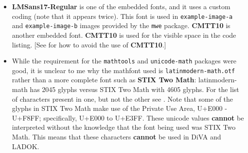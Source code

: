 \documentclass[12pt, twoside]{article}
\newcommand{\fname}[1]{\texttt{#1}}
\begin{document}
\begin{itemize}[label=\color{red}]
\item \textbf{LMSans17-Regular} is one of the embedded fonts, and it uses a custom coding (note that it appears twice). This font is used in \texttt{example-image-a} and \texttt{example-image-b} images provided by the \texttt{mwe} package. \textbf{CMTT10} is another embedded font. \textbf{CMTT10} is used for the visible space in the code listing. [See  for how to avoid the use of \textbf{CMTT10}.]

\item While the requirement for the \texttt{mathtools} and
  \texttt{unicode-math} packages were good, it is unclear to me why the mathfont used is \fname{latinmodern-math.otf} rather than a more complete font such as \textbf{STIX Two Math}:
  latinmodern-math has 2045 glyphs versus STIX Two Math with 4605 glyphs. For the list of characters present in one, but not the other see . Note that some of the glyphs in STIX Two Math make use of the Private Use Area, U+E000 - U+F8FF; specifically, U+E000 to  U+E3FF. These unicode values \textbf{cannot} be interpreted without the knowledge that the font being used was STIX Two Math. This means that these characters \textbf{cannot} be used in DiVA and LADOK.

\end{itemize}
\end{document}
